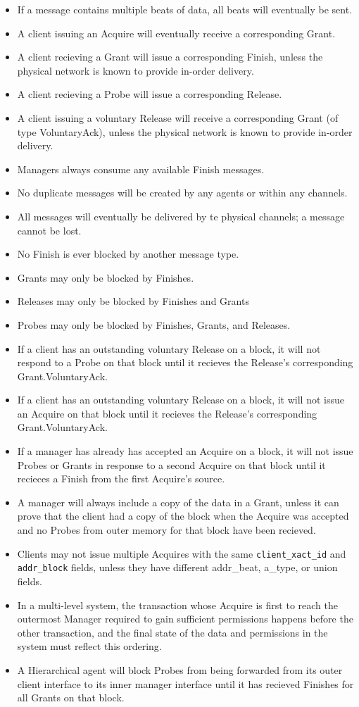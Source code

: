 \begin{itemize}
\item If a message contains multiple beats of data, all beats will eventually be sent.
\item A client issuing an Acquire will eventually receive a corresponding Grant.
\item A client recieving a Grant will issue a corresponding Finish,
unless the physical network is known to provide in-order delivery.
\item A client recieving a Probe will issue a corresponding Release.
\item A client issuing a voluntary Release will receive a corresponding Grant (of type VoluntaryAck), 
unless the physical network is known to provide in-order delivery.
\item Managers always consume any available Finish messages.
\item No duplicate messages will be created by any agents or within any channels.
\item All messages will eventually be delivered by te physical channels; a message cannot be lost.
\item No Finish is ever blocked by another message type.
\item Grants may only be blocked by Finishes.
\item Releases may only be blocked by Finishes and Grants
\item Probes may only be blocked by Finishes, Grants, and Releases.
\item If a client has an outstanding voluntary Release on a block, it will not respond to a Probe on that block until it recieves the Release's corresponding Grant.VoluntaryAck.
\item If a client has an outstanding voluntary Release on a block, it will not issue an Acquire on that block until it recieves the Release's corresponding Grant.VoluntaryAck.
\item If a manager has already has accepted an Acquire on a block, it will not issue Probes or Grants in response to a second Acquire on that block until it recieces a Finish from the first Acquire's source.
\item A manager will always include a copy of the data in a Grant, unless it can prove that the client had a copy of the block when the Acquire was accepted and no Probes from outer memory for that block have been recieved.
\item Clients may not issue multiple Acquires with the same {\tt client\_xact\_id} and {\tt addr\_block} fields, unless they have different {addr\_beat}, {a\_type}, or {union} fields.
\item In a multi-level system, the transaction whose Acquire is first to reach the outermost Manager required to gain sufficient permissions happens before the other transaction,
and the final state of the data and permissions in the system must reflect this ordering.
\item A Hierarchical agent will block Probes from being forwarded from its outer client interface to its inner manager interface until it has recieved Finishes for all Grants on that block.
\end{itemize}

